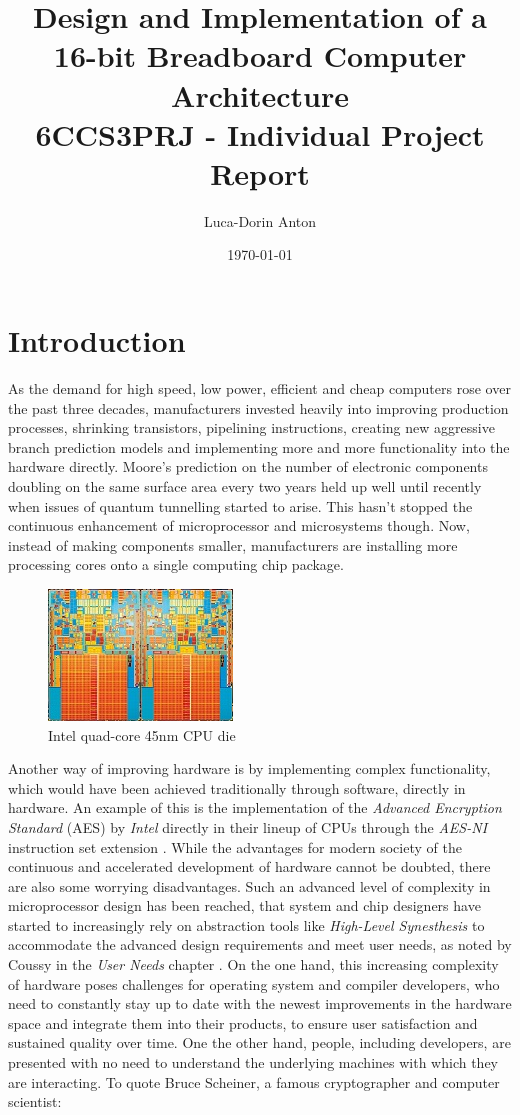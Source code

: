 \documentclass[11pt]{informatics-report}
\title{Design and Implementation of a 16-bit Breadboard Computer Architecture\\\vspace{0.2cm}6CCS3PRJ - Individual Project Report}
\author{Luca-Dorin Anton}
\date{\today}
\begin{document}
\createFrontMatter
\onehalfspacing
\tableofcontents
\doublespacing


\chapter{Introduction}
As the demand for high speed, low power, efficient and cheap computers rose over the past three decades,
manufacturers invested heavily into improving production processes, shrinking transistors, pipelining
instructions, creating new aggressive branch prediction models and implementing more and more functionality
into the hardware directly. Moore's prediction on the number of electronic components doubling on the
same surface area every two years held up well until recently when issues of quantum tunnelling started to
arise. This hasn't stopped the continuous enhancement of microprocessor and microsystems though. Now, instead
of making components smaller, manufacturers are installing more processing cores onto a single computing chip
package.
\begin{figure}[ht]
  \centering
  \includegraphics{45nm_quad_core_die}
  \caption{Intel quad-core 45nm CPU die}
  \label{intel_die}
\end{figure}
\linebreak
Another way of improving hardware is by implementing complex functionality, which would have been achieved traditionally through software, directly in hardware. An example of this is the implementation of the \emph{Advanced Encryption Standard} (AES) by \emph{Intel} directly in their lineup of CPUs through the \emph{AES-NI} instruction set extension \cite{aes2012ni}.
While the advantages for modern society of the continuous and accelerated development of hardware cannot be doubted,
there are also some worrying disadvantages. Such an advanced level of complexity in microprocessor design has been reached, that system and chip designers have started to increasingly rely on abstraction tools like \emph{ High-Level Synesthesis} to accommodate the advanced design requirements and meet user needs, as noted by Coussy in the \emph{User Needs} chapter \cite{coussy2008high}. On the one hand, this increasing complexity of hardware poses challenges for operating system and compiler developers, who need to constantly stay up to date with the newest improvements in the hardware space and integrate them into their products, to ensure user satisfaction and sustained quality over time. One the other hand, people, including developers, are presented with no need to understand the underlying machines with which they are interacting. To quote Bruce Scheiner, a famous cryptographer and computer scientist:
\end{document}
